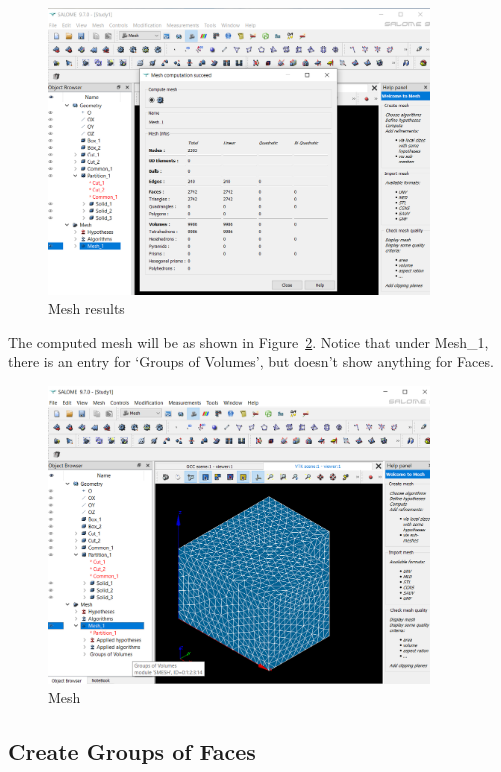 \begin{figure}[H]
\centering
\includegraphics[width=0.9\textwidth]{Salome-24}
\caption{Mesh results}\label{fg:salome-24}
\end{figure}

The computed mesh will be as shown in Figure~\ref{fg:salome-25}.  Notice that under Mesh\_1, there is an entry for `Groups of Volumes', but doesn't show anything for Faces.

\begin{figure}[H]
\centering
\includegraphics[width=0.9\textwidth]{Salome-25}
\caption{Mesh}\label{fg:salome-25}
\end{figure}

\subsection{Create Groups of Faces}

